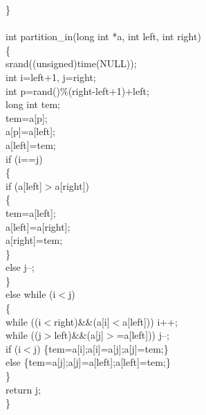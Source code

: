 \documentclass{article}
\begin{document}
\}\\
\\
int partition\_in(long int *a, int left, int right)\\
\{\\
    srand((unsigned)time(NULL));\\
    int i=left+1, j=right;\\
    int p=rand()\%(right-left+1)+left;\\
    long int tem;\\
    tem=a[p];\\
    a[p]=a[left];\\
    a[left]=tem;\\
    if (i==j)\\
    \{\\
	if (a[left]$>$a[right])\\
	\{\\
	    tem=a[left];\\
	    a[left]=a[right];\\
	    a[right]=tem;\\
	\}\\
	else j--;\\
    \}\\
    else while (i$<$j)\\
    \{\\
        while ((i$<$right)\&\&(a[i]$<$a[left])) i++;\\
        while ((j$>$left)\&\&(a[j]$>$=a[left])) j--;\\
        if (i$<$j) \{tem=a[i];a[i]=a[j];a[j]=tem;\}\\
        else \{tem=a[j];a[j]=a[left];a[left]=tem;\}\\
    \}\\
    return j;\\
\}\\
\\
\end{document}
